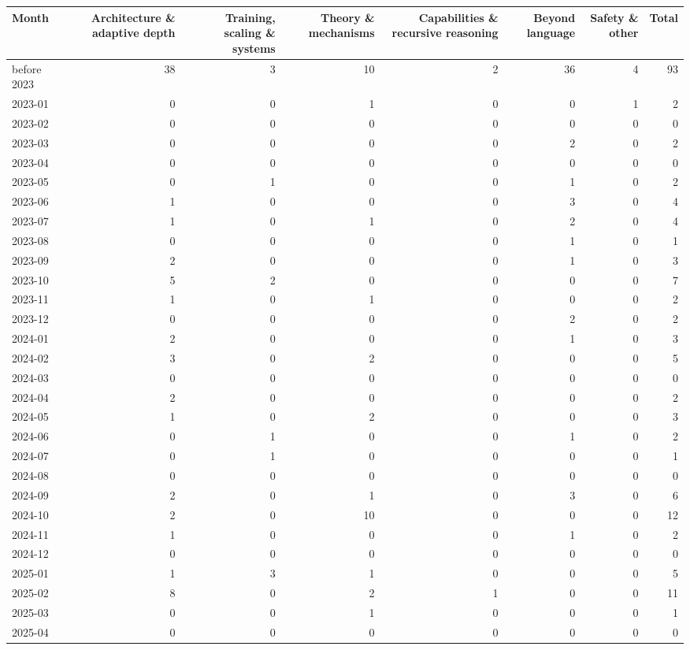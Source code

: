 \begin{tabular}{lrrrrrrr}
\toprule
Month & Architecture \& adaptive depth & Training, scaling \& systems & Theory \& mechanisms & Capabilities \& recursive reasoning & Beyond language & Safety \& other & Total \\
\midrule
before 2023 & 38 & 3 & 10 & 2 & 36 & 4 & 93 \\
2023-01 & 0 & 0 & 1 & 0 & 0 & 1 & 2 \\
2023-02 & 0 & 0 & 0 & 0 & 0 & 0 & 0 \\
2023-03 & 0 & 0 & 0 & 0 & 2 & 0 & 2 \\
2023-04 & 0 & 0 & 0 & 0 & 0 & 0 & 0 \\
2023-05 & 0 & 1 & 0 & 0 & 1 & 0 & 2 \\
2023-06 & 1 & 0 & 0 & 0 & 3 & 0 & 4 \\
2023-07 & 1 & 0 & 1 & 0 & 2 & 0 & 4 \\
2023-08 & 0 & 0 & 0 & 0 & 1 & 0 & 1 \\
2023-09 & 2 & 0 & 0 & 0 & 1 & 0 & 3 \\
2023-10 & 5 & 2 & 0 & 0 & 0 & 0 & 7 \\
2023-11 & 1 & 0 & 1 & 0 & 0 & 0 & 2 \\
2023-12 & 0 & 0 & 0 & 0 & 2 & 0 & 2 \\
2024-01 & 2 & 0 & 0 & 0 & 1 & 0 & 3 \\
2024-02 & 3 & 0 & 2 & 0 & 0 & 0 & 5 \\
2024-03 & 0 & 0 & 0 & 0 & 0 & 0 & 0 \\
2024-04 & 2 & 0 & 0 & 0 & 0 & 0 & 2 \\
2024-05 & 1 & 0 & 2 & 0 & 0 & 0 & 3 \\
2024-06 & 0 & 1 & 0 & 0 & 1 & 0 & 2 \\
2024-07 & 0 & 1 & 0 & 0 & 0 & 0 & 1 \\
2024-08 & 0 & 0 & 0 & 0 & 0 & 0 & 0 \\
2024-09 & 2 & 0 & 1 & 0 & 3 & 0 & 6 \\
2024-10 & 2 & 0 & 10 & 0 & 0 & 0 & 12 \\
2024-11 & 1 & 0 & 0 & 0 & 1 & 0 & 2 \\
2024-12 & 0 & 0 & 0 & 0 & 0 & 0 & 0 \\
2025-01 & 1 & 3 & 1 & 0 & 0 & 0 & 5 \\
2025-02 & 8 & 0 & 2 & 1 & 0 & 0 & 11 \\
2025-03 & 0 & 0 & 1 & 0 & 0 & 0 & 1 \\
2025-04 & 0 & 0 & 0 & 0 & 0 & 0 & 0 \\

\end{tabular}
